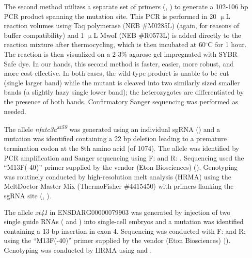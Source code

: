 The second method utilizes a separate set of primers (, ) to generate a 102\hyp{}106 bp PCR product spanning the mutation site. This PCR is performed in 20 $\upmu$L reaction volumes using Taq polymerase (NEB \#M0285L) (again, for reasons of buffer compatibility) and 1 $\upmu$L MwoI (NEB \#R0573L) is added directly to the reaction mixture after thermocycling, which is then incubated at 60$^{\circ}$C for 1 hour. The reaction is then visualized on a 2\hyp{}3\% agarose gel impregnated with SYBR Safe dye. In our hands, this second method is faster, easier, more robust, and more cost\hyp{}effective. In both cases, the wild\hyp{}type product is unable to be cut (single larger band) while the mutant is cleaved into two similarly sized smaller bands (a slightly hazy single lower band); the heterozygotes are differentiated by the presence of both bands. Confirmatory Sanger sequencing was performed as needed.

The allele \textit{nfatc3a\textsuperscript{xt59}} was generated using an individual sgRNA () and a mutation was identified containing a 22 bp deletion leading to a premature termination codon at the 8th amino acid (of 1074). The allele was identified by PCR amplification and Sanger sequencing using F:  and R: . Sequencing used the ``M13F(\hyp{}40)'' primer supplied by the vendor (Eton Biosciences) (). Genotyping was routinely conducted by high\hyp{}resolution melt analysis (HRMA) using the MeltDoctor Master Mix (ThermoFisher \#4415450) with primers flanking the sgRNA site (, ). 

The allele \textit{xt41} in ENSDARG00000079903 was generated by injection of two single guide RNAs ( and ) into single\hyp{}cell embryos and a mutation was identified containing a 13 bp insertion in exon 4. Sequencing was conducted with F:  and R:  using the ``M13F(\hyp{}40)'' primer supplied by the vendor (Eton Biosciences) (). Genotyping was conducted by HRMA using  and .

